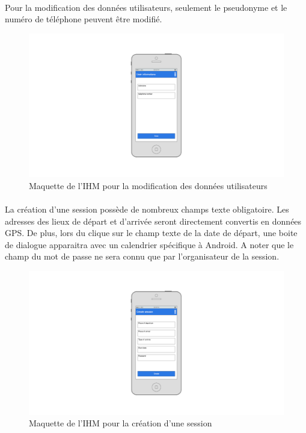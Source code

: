 \documentclass[titlepage, 12pt]{report}
\begin{document}
\clearpage

\paragraph{}Pour la modification des données utilisateurs, seulement le pseudonyme et le numéro de téléphone peuvent être modifié.

\begin{figure}[!h]
	\caption{Maquette de l'IHM pour la modification des données utilisateurs}
	\label{modify_user_account}
	\centering
	\includegraphics[scale=0.3]{images/mockups/modify_user_profile.png}
\end{figure}

\clearpage

\paragraph{}La création d'une session possède de nombreux champs texte obligatoire. Les adresses des lieux de départ et d'arrivée seront directement convertis en données GPS. De plus, lors du clique sur le champ texte de la date de départ, une boite de dialogue apparaitra avec un calendrier spécifique à Android. A noter que le champ du mot de passe ne sera connu que par l'organisateur de la session.

\begin{figure}[!h]
\caption{Maquette de l'IHM pour la création d'une session}
\label{create_session}
\centering
\includegraphics[scale=0.3]{images/mockups/create_session.png}
\end{figure}
\end{document}
